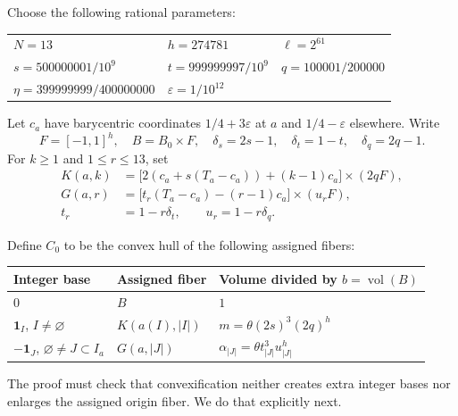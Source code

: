 \documentclass[11pt]{article}
\newcommand{\vol}{\operatorname{vol}}
\newcommand{\one}{\mathbf 1}
\begin{document}
Choose the following rational parameters:
\begin{center}
\begin{tabular}{lll}
\toprule
$N=13$ & $h=274781$ & $\ell=2^{61}$\\
$s=500000001/10^9$ & $t=999999997/10^9$ & $q=100001/200000$\\
$\eta=399999999/400000000$ & $\varepsilon=1/10^{12}$ & \\
\bottomrule
\end{tabular}
\end{center}
Let $c_a$ have barycentric coordinates $1/4+3\varepsilon$ at $a$ and
$1/4-\varepsilon$ elsewhere. Write
\[
 F=[-1,1]^h,\quad B=B_0\times F,\quad
 \delta_s=2s-1,\quad\delta_t=1-t,\quad\delta_q=2q-1.
\]
For $k\ge1$ and $1\le r\le13$, set
\begin{align*}
 K(a,k)&=\bigl[2(c_a+s(T_a-c_a))+(k-1)c_a\bigr]\times(2qF),\\
 G(a,r)&=\bigl[t_r(T_a-c_a)-(r-1)c_a\bigr]\times(u_rF),\\
 t_r&=1-r\delta_t,\qquad u_r=1-r\delta_q.
\end{align*}
\begin{samepage}
Define $C_0$ to be the convex hull of the following assigned fibers:
\begin{center}
\begin{tabular}{lll}
\toprule
Integer base & Assigned fiber & Volume divided by $b=\vol(B)$\\
\midrule
$0$ & $B$ & $1$\\
$\one_I$, $I\ne\varnothing$ & $K(a(I),|I|)$ & $m=\theta(2s)^3(2q)^h$\\
$-\one_J$, $\varnothing\ne J\subset I_a$ & $G(a,|J|)$ &
 $\alpha_{|J|}=\theta t_{|J|}^3u_{|J|}^h$\\
\bottomrule
\end{tabular}
\end{center}
\end{samepage}
The proof must check that convexification neither creates extra integer
bases nor enlarges the assigned origin fiber. We do that explicitly next.
\end{document}
